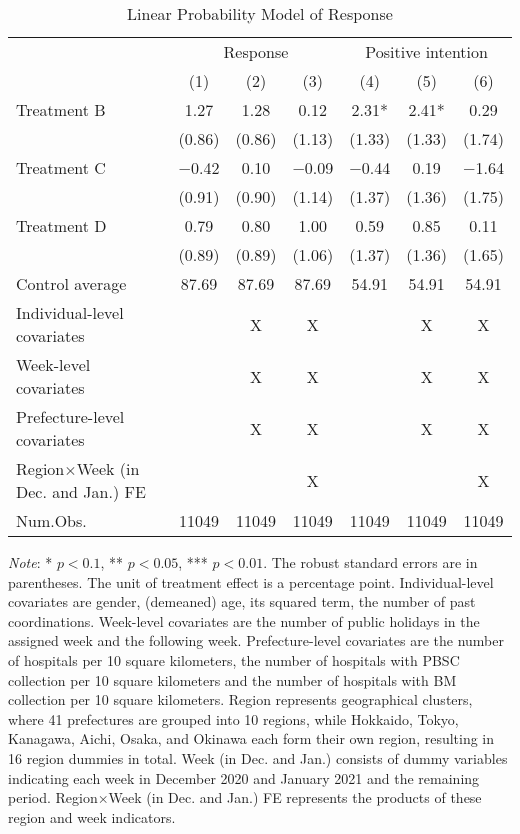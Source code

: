 \documentclass[12pt, a4paper]{article}
\begin{document}
\begin{table}[H]

\caption{\label{tab:reply-lm}Linear Probability Model of Response}
\centering
\fontsize{8}{10}\selectfont
\begin{threeparttable}
\begin{tabular}[t]{lcccccc}
\toprule
\multicolumn{1}{c}{ } & \multicolumn{3}{c}{Response} & \multicolumn{3}{c}{Positive intention} \\
\cmidrule(l{3pt}r{3pt}){2-4} \cmidrule(l{3pt}r{3pt}){5-7}
  & (1) & (2) & (3) & (4) & (5) & (6)\\
\midrule
Treatment B & \num{1.27} & \num{1.28} & \num{0.12} & \num{2.31}* & \num{2.41}* & \num{0.29}\\
 & (\num{0.86}) & (\num{0.86}) & (\num{1.13}) & (\num{1.33}) & (\num{1.33}) & (\num{1.74})\\
Treatment C & \num{-0.42} & \num{0.10} & \num{-0.09} & \num{-0.44} & \num{0.19} & \num{-1.64}\\
 & (\num{0.91}) & (\num{0.90}) & (\num{1.14}) & (\num{1.37}) & (\num{1.36}) & (\num{1.75})\\
Treatment D & \num{0.79} & \num{0.80} & \num{1.00} & \num{0.59} & \num{0.85} & \num{0.11}\\
 & (\num{0.89}) & (\num{0.89}) & (\num{1.06}) & (\num{1.37}) & (\num{1.36}) & (\num{1.65})\\
\midrule
Control average & 87.69 & 87.69 & 87.69 & 54.91 & 54.91 & 54.91\\
Individual-level covariates &  & X & X &  & X & X\\
Week-level covariates &  & X & X &  & X & X\\
Prefecture-level covariates &  & X & X &  & X & X\\
Region$\times$Week (in Dec. and Jan.) FE &  &  & X &  &  & X\\
Num.Obs. & \num{11049} & \num{11049} & \num{11049} & \num{11049} & \num{11049} & \num{11049}\\
\bottomrule
\end{tabular}
\begin{tablenotes}
\item \emph{Note}: * $p < 0.1$, ** $p < 0.05$, *** $p < 0.01$. The robust standard errors are in parentheses. The unit of treatment effect is a percentage point. Individual-level covariates are gender, (demeaned) age, its squared term, the number of past coordinations. Week-level covariates are the number of public holidays in the assigned week and the following week. Prefecture-level covariates are the number of hospitals per 10 square kilometers, the number of hospitals with PBSC collection per 10 square kilometers and the number of hospitals with BM collection per 10 square kilometers. Region represents geographical clusters, where 41 prefectures are grouped into 10 regions, while Hokkaido, Tokyo, Kanagawa, Aichi, Osaka, and Okinawa each form their own region, resulting in 16 region dummies in total. Week (in Dec. and Jan.) consists of dummy variables indicating each week in December 2020 and January 2021 and the remaining period. Region$\times$Week (in Dec. and Jan.) FE represents the products of these region and week indicators.

\end{tablenotes}
\end{threeparttable}
\end{table}
\end{document}
